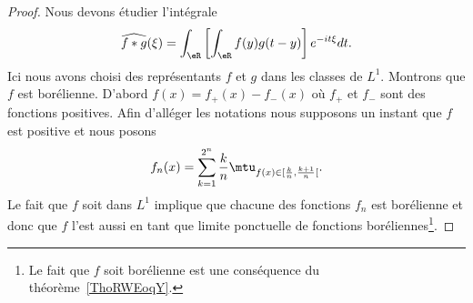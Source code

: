 \begin{proof}
    Nous devons étudier l'intégrale
    \begin{equation}
        \widehat{f*g}(\xi)=\int_{\eR}\left[ \int_{\eR} f(y)g(t-y)\right] e^{-it\xi} dt.
    \end{equation}
    Ici nous avons choisi des représentants \( f\) et \( g\) dans les classes de \( L^1\). Montrons que \( f\) est borélienne. D'abord \( f(x)=f_+(x)-f_-(x)\) où \( f_+\) et \( f_-\) sont des fonctions positives. Afin d'alléger les notations nous supposons un instant que \( f\) est positive et nous posons
    \begin{equation}
        f_n(x)=\sum_{k=1}^{2^n} \frac{ k }{ n }\mtu_{f(x)\in\mathopen[ \frac{ k }{ n } , \frac{ k+1 }{ n } [}.
    \end{equation}
    Le fait que \( f\) soit dans \( L^1\) implique que chacune des fonctions \( f_n\) est borélienne et donc que \( f\) l'est aussi en tant que limite ponctuelle de fonctions boréliennes\footnote{Le fait que \( f\) soit borélienne est une conséquence du théorème~\ref{ThoRWEoqY}.}.


\end{proof}
